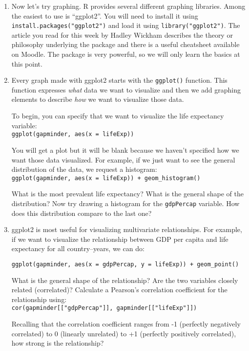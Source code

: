 \documentclass[a4paper,12pt]{article}
\begin{document}
\begin{enumerate}
\item Now let's try graphing. R provides several different graphing libraries. Among the easiest to use is ``ggplot2''. You will need to install it using \texttt{install.packages("ggplot2")} and load it using \texttt{library("ggplot2")}. The article you read for this week by Hadley Wickham describes the theory or philosophy underlying the package and there is a useful cheatsheet available on Moodle. The package is very powerful, so we will only learn the basics at this point.

\item Every graph made with ggplot2 starts with the \texttt{ggplot()} function. This function expresses \textit{what} data we want to visualize and then we add graphing elements to describe \textit{how} we want to visualize those data.

To begin, you can specify that we want to visualize the life expectancy variable:\\
\texttt{ggplot(gapminder, aes(x = lifeExp))}

You will get a plot but it will be blank because we haven't specified how we want those data visualized. For example, if we just want to see the general distribution of the data, we request a histogram:\\

\texttt{ggplot(gapminder, aes(x = lifeExp)) + geom\_histogram()}

What is the most prevalent life expectancy? What is the general shape of the distribution? Now try drawing a histogram for the \texttt{gdpPercap} variable. How does this distribution compare to the last one?

\item ggplot2 is most useful for visualizing multivariate relationships. For example, if we want to visualize the relationship between GDP per capita and life expectancy for all country--years, we can do:

\texttt{ggplot(gapminder, aes(x = gdpPercap, y = lifeExp)) + geom\_point()}

What is the general shape of the relationship? Are the two variables closely related (correlated)? Calculate a Pearson's correlation coefficient for the relationship using:\\
\texttt{cor(gapminder[["gdpPercap"]], gapminder[["lifeExp"]])}

Recalling that the correlation coefficient ranges from -1 (perfectly negatively correlated) to 0 (linearly unrelated) to +1 (perfectly positively correlated), how strong is the relationship?


\end{enumerate}
\end{document}
